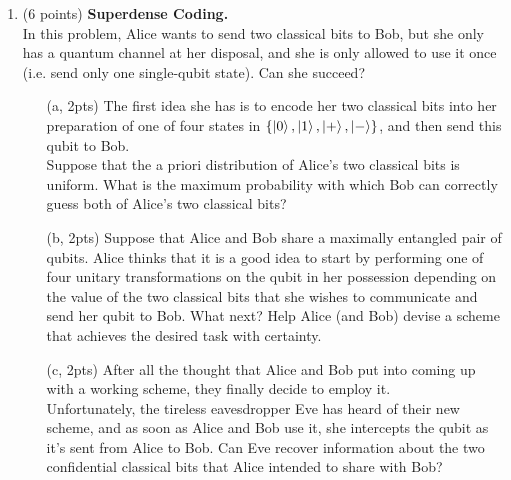 \documentclass[12pt]{article}
\begin{document}
\begin{enumerate}
		




\item (6 points) \textbf{Superdense Coding.}\\
In this problem, Alice wants to send two classical bits to Bob, but she only has a quantum channel at her disposal, and she is only allowed to use it once (i.e. send only one single-qubit state). Can she succeed? \\
\begin{enumerate}
\item[(a, 2pts)] The first idea she has is to encode her two classical bits into her preparation of one of four states in $\{ \ket{0}, \ket{1}, \ket{+}, \ket{-}\}$, and then send this qubit to Bob. \\
Suppose that the a priori distribution of Alice's two classical bits is uniform. What is the maximum probability with which Bob can correctly guess both of Alice's two classical bits?\\
\item[(b, 2pts)] Suppose that Alice and Bob share a maximally entangled pair of qubits. Alice thinks that it is a good idea to start by performing one of four unitary transformations on the qubit in her possession depending on the value of the two classical bits that she wishes to communicate and send her qubit to Bob. What next? Help Alice (and Bob) devise a scheme that achieves the desired task with certainty.\\
\item[(c, 2pts)] After all the thought that Alice and Bob put into coming up with a working scheme, they finally decide to employ it.\\
Unfortunately, the tireless eavesdropper Eve has heard of their new scheme, and as soon as Alice and Bob use it, she intercepts the qubit as it's sent from Alice to Bob. Can Eve recover information about the two confidential classical bits that Alice intended to share with Bob?\\
\end{enumerate}



\end{enumerate}
\end{document}
